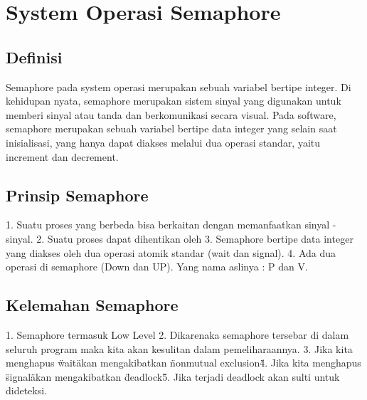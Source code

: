 \section{System Operasi Semaphore}
\subsection{Definisi}
Semaphore pada system operasi merupakan sebuah variabel bertipe integer. Di kehidupan nyata, semaphore merupakan sistem sinyal yang digunakan untuk memberi 
sinyal atau tanda dan berkomunikasi secara visual. Pada software, semaphore merupakan sebuah variabel bertipe data integer yang selain saat inisialisasi, yang hanya dapat diakses melalui dua operasi standar, yaitu increment dan decrement.
\subsection{Prinsip Semaphore}
1. Suatu proses yang berbeda bisa berkaitan dengan memanfaatkan sinyal - sinyal.
2. Suatu proses dapat dihentikan oleh 
3. Semaphore bertipe data integer yang diakses oleh dua operasi atomik standar (wait dan signal).
4. Ada dua operasi di semaphore (Down dan UP). Yang nama aslinya : P dan V.
\subsection{Kelemahan Semaphore}
1. Semaphore termasuk Low Level
2. Dikarenaka semaphore tersebar di dalam seluruh program maka kita akan kesulitan dalam pemeliharaannya.
3. Jika kita menghapus \"wait\" akan mengakibatkan \"nonmutual exclusion\"
4. Jika kita menghapus \"signal\" akan mengakibatkan \"deadlock\"
5. Jika terjadi deadlock akan sulti untuk dideteksi.